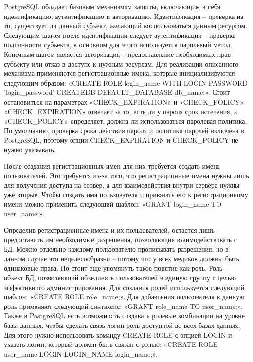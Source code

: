 PostgreSQL обладает базовым механизмом защиты, включающим в себя идентификацию, аутентификацию и авторизацию. Идентификация – проверка на то, существует ли данный субъект, желающий воспользоваться данным ресурсом. Следующим шагом после идентификации следует аутентификация – проверка подлинности субъекта, в основном для этого используется паролевый метод. Конечным шагом является авторизация – предоставление необходимых прав субъекту или отказ в доступе к нужным ресурсам. Для реализации описанного механизма применяются регистрационные имена, которые инициализируются следующим образом: «CREATE ROLE login\_name WITH LOGIN PASSWORD 'login\_password' CREATEDB DEFAULT\_DATABASE db\_name;». Стоит остановиться на параметрах «CHECK\_EXPIRATION» и «CHECK\_POLICY». «CHECK\_EXPIRATION» отвечает за то, есть ли у пароля срок истечения, а «CHECK\_POLICY» определяет, должна ли использоваться паролевая политика. По умолчанию, проверка срока действия пароля и политики паролей включена в PostgreSQL, поэтому опции CHECK\_EXPIRATION и CHECK\_POLICY не нужно указывать.

После создания регистрационных имен для них требуется создать имена пользователей. Это требуется из-за того, что регистрационные имена нужны лишь для получения доступа на сервер, а для взаимодействия внутри сервера нужны уже вторые. Чтобы создать имя пользователя и привязать его к регистрационному имени можно применить следующий шаблон: «GRANT login\_name TO user\_name;».

Определив регистрационные имена и их пользователей, остается лишь предоставить им необходимые разрешения, позволяющие взаимодействовать с БД. Можно отдельно каждому пользователю прописывать разрешения, но в данном случае это нецелесообразно – потому что у всех медиков должны быть одинаковые права. Но стоит еще упомянуть такое понятие как роль. Роль – объект БД, позволяющий объединять пользователей в единую группу с целью эффективного администрирования. Для создания ролей используется следующий шаблон: «CREATE ROLE role\_name;». Для добавления пользователя в данную роль применяют следующий синтаксис: «GRANT role\_name TO user\_name;». Также в PostgreSQL есть возможность создавать ролевые комбинации на уровне базы данных, чтобы сделать связь логин-роль доступной во всех базах данных. Для этого нужно использовать команду CREATE ROLE с опцией LOGIN и указать логин, который должен быть связан с ролью: «CREATE ROLE user\_name LOGIN LOGIN\_NAME login\_name;».

